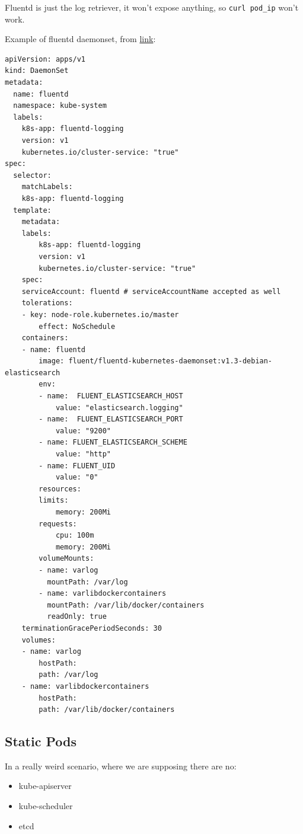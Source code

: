 \documentclass{article}
\newenvironment{blocktemplateIII}[1]{%
    \tcolorbox[beamer,%
    noparskip,breakable,
    ,colframe=Red,%
    colbacklower=LimeGreen!75!LightGreen,%
    title=#1]}%
    {\endtcolorbox}
\newenvironment{codetemplate}[1][]{%
  \mybasecolorbox[#1]
  \itshape
}{%
  \endmybasecolorbox
}
\begin{document}
\begin{blocktemplateIII}{WARNING}
Fluentd is just the log retriever, it won't expose anything, so \verb|curl pod_ip| won't work.
\end{blocktemplateIII}

Example of fluentd daemonset, from \href{https://medium.com/@MetricFire/logging-for-kubernetes-fluentd-and-elasticsearch-9b95c7c64da}{link}:
\begin{codetemplate}{}
\begin{verbatim}
apiVersion: apps/v1
kind: DaemonSet
metadata:
  name: fluentd
  namespace: kube-system
  labels:
	k8s-app: fluentd-logging
	version: v1
	kubernetes.io/cluster-service: "true"
spec:
  selector:
	matchLabels:
  	k8s-app: fluentd-logging
  template:
	metadata:
  	labels:
    	k8s-app: fluentd-logging
    	version: v1
    	kubernetes.io/cluster-service: "true"
	spec:
  	serviceAccount: fluentd # serviceAccountName accepted as well
  	tolerations:
  	- key: node-role.kubernetes.io/master
    	effect: NoSchedule
  	containers:
  	- name: fluentd
    	image: fluent/fluentd-kubernetes-daemonset:v1.3-debian-elasticsearch
    	env:
      	- name:  FLUENT_ELASTICSEARCH_HOST
        	value: "elasticsearch.logging"
      	- name:  FLUENT_ELASTICSEARCH_PORT
        	value: "9200"
      	- name: FLUENT_ELASTICSEARCH_SCHEME
        	value: "http"
      	- name: FLUENT_UID
        	value: "0"
    	resources:
      	limits:
        	memory: 200Mi
      	requests:
        	cpu: 100m
        	memory: 200Mi
    	volumeMounts:
    	- name: varlog
      	  mountPath: /var/log
    	- name: varlibdockercontainers
      	  mountPath: /var/lib/docker/containers
      	  readOnly: true
  	terminationGracePeriodSeconds: 30
  	volumes:
  	- name: varlog
    	hostPath:
      	path: /var/log
  	- name: varlibdockercontainers
    	hostPath:
      	path: /var/lib/docker/containers
\end{verbatim}
\end{codetemplate}

\subsection{Static Pods}
In a really weird scenario, where we are supposing there are no:
\begin{itemize}
    \item kube-apiserver
    \item kube-scheduler
    \item etcd
\end{itemize}
\end{document}
